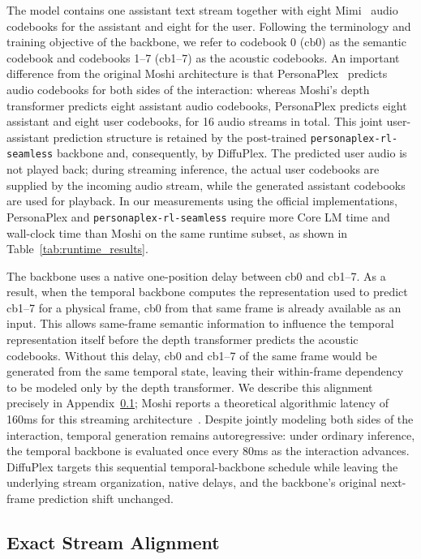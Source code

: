 The model contains one assistant text stream together with eight Mimi~\citep{defossez2024moshispeechtextfoundationmodel} audio codebooks for the assistant and eight for the user.
Following the terminology and training objective of the backbone, we refer to codebook 0 (cb0) as the semantic codebook and codebooks 1--7 (cb1--7) as the acoustic codebooks.
An important difference from the original Moshi architecture is that PersonaPlex~\citep{11463413} predicts audio codebooks for both sides of the interaction: whereas Moshi's depth transformer predicts eight assistant audio codebooks, PersonaPlex predicts eight assistant and eight user codebooks, for 16 audio streams in total.
This joint user-assistant prediction structure is retained by the post-trained \texttt{personaplex-rl-seamless} backbone and, consequently, by DiffuPlex.
The predicted user audio is not played back; during streaming inference, the actual user codebooks are supplied by the incoming audio stream, while the generated assistant codebooks are used for playback.
In our measurements using the official implementations, PersonaPlex and \texttt{personaplex-rl-seamless} require more Core LM time and wall-clock time than Moshi on the same runtime subset, as shown in Table~\ref{tab:runtime_results}.

The backbone uses a native one-position delay between cb0 and cb1--7.
As a result, when the temporal backbone computes the representation used to predict cb1--7 for a physical frame, cb0 from that same frame is already available as an input.
This allows same-frame semantic information to influence the temporal representation itself before the depth transformer predicts the acoustic codebooks.
Without this delay, cb0 and cb1--7 of the same frame would be generated from the same temporal state, leaving their within-frame dependency to be modeled only by the depth transformer.
We describe this alignment precisely in Appendix~\ref{asubsec:stream_alignment}; Moshi reports a theoretical algorithmic latency of 160ms for this streaming architecture~\citep{defossez2024moshispeechtextfoundationmodel}.
Despite jointly modeling both sides of the interaction, temporal generation remains autoregressive: under ordinary inference, the temporal backbone is evaluated once every 80ms as the interaction advances.
DiffuPlex targets this sequential temporal-backbone schedule while leaving the underlying stream organization, native delays, and the backbone's original next-frame prediction shift unchanged.

\subsection{Exact Stream Alignment}
\label{asubsec:stream_alignment}

